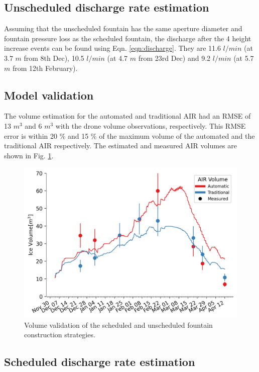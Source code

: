 \documentclass[tc, manuscript]{copernicus}
\begin{document}
\subsection{Unscheduled discharge rate estimation}

Assuming that the unscheduled fountain has the same aperture diameter and fountain pressure loss as the
scheduled fountain, the discharge after the 4 height increase events can be found using Eqn.
\ref{eqn:discharge}. They are 11.6 $l/min$ (at 3.7 $m$ from 8th Dec), 10.5 $l/min$ (at 4.7 $m$ from 23rd Dec)
and 9.2 $l/min$ (at 5.7 $m$ from 12th February).


\subsection{Model validation}

The volume estimation for the automated and traditional AIR had an RMSE of 13 $m^3$ and 6 $m^3$ with the drone
volume observations, respectively. This RMSE error is within 20 \% and 15 \% of the maximum volume of the
automated and the traditional AIR respectively. The estimated and measured AIR volumes are shown in Fig.
\ref{fig:validation}.  

\begin{figure}[t] \includegraphics[width=12cm] {Figures/validation.png} \caption{Volume validation of the
scheduled and unscheduled fountain construction strategies.} \label{fig:validation} \end{figure}

\subsection{Scheduled discharge rate estimation}
\end{document}
